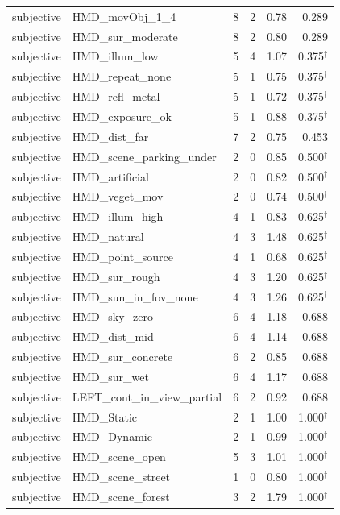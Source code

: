 \documentclass[11pt,a4paper]{article}
\begin{document}
\begin{longtable}{llrrrr}
subjective & HMD\_movObj\_1\_4 & 8 & 2 & 0.78 & 0.289 \\
subjective & HMD\_sur\_moderate & 8 & 2 & 0.80 & 0.289 \\
subjective & HMD\_illum\_low & 5 & 4 & 1.07 & 0.375$^{\dagger}$ \\
subjective & HMD\_repeat\_none & 5 & 1 & 0.75 & 0.375$^{\dagger}$ \\
subjective & HMD\_refl\_metal & 5 & 1 & 0.72 & 0.375$^{\dagger}$ \\
subjective & HMD\_exposure\_ok & 5 & 1 & 0.88 & 0.375$^{\dagger}$ \\
subjective & HMD\_dist\_far & 7 & 2 & 0.75 & 0.453 \\
subjective & HMD\_scene\_parking\_under & 2 & 0 & 0.85 & 0.500$^{\dagger}$ \\
subjective & HMD\_artificial & 2 & 0 & 0.82 & 0.500$^{\dagger}$ \\
subjective & HMD\_veget\_mov & 2 & 0 & 0.74 & 0.500$^{\dagger}$ \\
subjective & HMD\_illum\_high & 4 & 1 & 0.83 & 0.625$^{\dagger}$ \\
subjective & HMD\_natural & 4 & 3 & 1.48 & 0.625$^{\dagger}$ \\
subjective & HMD\_point\_source & 4 & 1 & 0.68 & 0.625$^{\dagger}$ \\
subjective & HMD\_sur\_rough & 4 & 3 & 1.20 & 0.625$^{\dagger}$ \\
subjective & HMD\_sun\_in\_fov\_none & 4 & 3 & 1.26 & 0.625$^{\dagger}$ \\
subjective & HMD\_sky\_zero & 6 & 4 & 1.18 & 0.688 \\
subjective & HMD\_dist\_mid & 6 & 4 & 1.14 & 0.688 \\
subjective & HMD\_sur\_concrete & 6 & 2 & 0.85 & 0.688 \\
subjective & HMD\_sur\_wet & 6 & 4 & 1.17 & 0.688 \\
subjective & LEFT\_cont\_in\_view\_partial & 6 & 2 & 0.92 & 0.688 \\
subjective & HMD\_Static & 2 & 1 & 1.00 & 1.000$^{\dagger}$ \\
subjective & HMD\_Dynamic & 2 & 1 & 0.99 & 1.000$^{\dagger}$ \\
subjective & HMD\_scene\_open & 5 & 3 & 1.01 & 1.000$^{\dagger}$ \\
subjective & HMD\_scene\_street & 1 & 0 & 0.80 & 1.000$^{\dagger}$ \\
subjective & HMD\_scene\_forest & 3 & 2 & 1.79 & 1.000$^{\dagger}$ \\

\end{longtable}
\end{document}
